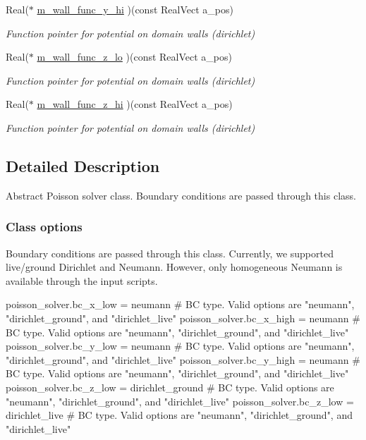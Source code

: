 \begin{DoxyCompactItemize}
Real($\ast$ \hyperlink{classpoisson__solver_ae468dab3917bfc3765d2b961c2f3953c}{m\+\_\+wall\+\_\+func\+\_\+y\+\_\+hi} )(const Real\+Vect a\+\_\+pos)
\begin{DoxyCompactList}\small\item\em Function pointer for potential on domain walls (dirichlet) \end{DoxyCompactList}\item 
Real($\ast$ \hyperlink{classpoisson__solver_a7e35d18262538cc083d62f512261bf2d}{m\+\_\+wall\+\_\+func\+\_\+z\+\_\+lo} )(const Real\+Vect a\+\_\+pos)
\begin{DoxyCompactList}\small\item\em Function pointer for potential on domain walls (dirichlet) \end{DoxyCompactList}\item 
Real($\ast$ \hyperlink{classpoisson__solver_a397aa517a1927333c65bd99ff8642a46}{m\+\_\+wall\+\_\+func\+\_\+z\+\_\+hi} )(const Real\+Vect a\+\_\+pos)
\begin{DoxyCompactList}\small\item\em Function pointer for potential on domain walls (dirichlet) \end{DoxyCompactList}\end{DoxyCompactItemize}


\subsection{Detailed Description}
Abstract Poisson solver class. Boundary conditions are passed through this class. 

\subsubsection*{Class options }

Boundary conditions are passed through this class. Currently, we supported live/ground Dirichlet and Neumann. However, only homogeneous Neumann is available through the input scripts. \begin{DoxyVerb}  poisson_solver.bc_x_low  = neumann               # BC type. Valid options are "neumann", "dirichlet_ground", and "dirichlet_live"
  poisson_solver.bc_x_high = neumann               # BC type. Valid options are "neumann", "dirichlet_ground", and "dirichlet_live"
  poisson_solver.bc_y_low  = neumann               # BC type. Valid options are "neumann", "dirichlet_ground", and "dirichlet_live"
  poisson_solver.bc_y_high = neumann               # BC type. Valid options are "neumann", "dirichlet_ground", and "dirichlet_live"
  poisson_solver.bc_z_low  = dirichlet_ground      # BC type. Valid options are "neumann", "dirichlet_ground", and "dirichlet_live"
  poisson_solver.bc_z_low  = dirichlet_live        # BC type. Valid options are "neumann", "dirichlet_ground", and "dirichlet_live"\end{DoxyVerb}
 

